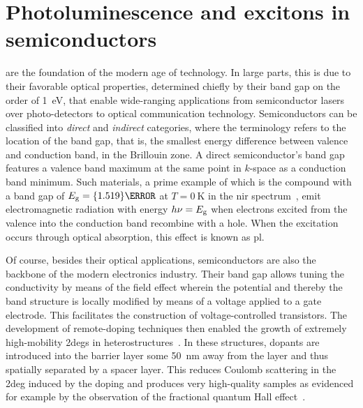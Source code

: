 \chapter{Photoluminescence and excitons in semiconductors}\label{ch:exp:theory}
 are the foundation of the modern age of technology.
In large parts, this is due to their favorable optical properties, determined chiefly by their band gap on the order of \qty{1}{\electronvolt}, that enable wide-ranging applications from semiconductor lasers over photo-detectors to optical communication technology.
Semiconductors can be classified into \emph{direct} and \emph{indirect} categories, where the terminology refers to the location of the band gap, that is, the smallest energy difference between valence and conduction band, in the Brillouin zone.
A direct semiconductor's band gap features a valence band maximum at the same point in $k$-space as a conduction band minimum.
Such materials, a prime example of which is the compound  with a band gap of $E_{\mr{g}}=\qty{1.519}{\electronvolt}$ at $T=\qty{0}{\kelvin}$ in the \gls{nir} spectrum~\cite{Vurgaftman2001}, emit electromagnetic radiation with energy $h\nu = E_{\mathrm{g}}$ when electrons excited from the valence into the conduction band recombine with a hole.
When the excitation occurs through optical absorption, this effect is known as \acrlong{pl}.

Of course, besides their optical applications, semiconductors are also the backbone of the modern electronics industry.
Their band gap allows tuning the conductivity by means of the field effect wherein the potential and thereby the band structure is locally modified by means of a voltage applied to a gate electrode.
This facilitates the construction of voltage-controlled transistors.
The development of remote-doping techniques then enabled the growth of extremely high-mobility \glspl{2deg} in \GaAsAlGaAs heterostructures~\cite{Ihn2009}.
In these structures, dopants are introduced into the  barrier layer some \qty{50}{\nano\meter} away from the  layer and thus spatially separated by a  spacer layer.
This reduces Coulomb scattering in the \gls{2deg} induced by the doping and produces very high-quality samples as evidenced for example by the observation of the fractional quantum Hall effect~\cite{Stormer1999a}.

